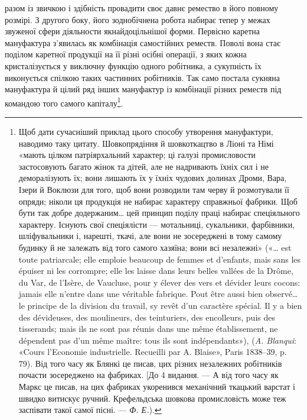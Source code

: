 \parcont{}  %
разом із звичкою і здібність провадити своє давнє ремество в
його повному розмірі. З другого боку, його зоднобічнена робота
набирає тепер у межах звуженої сфери діяльности якнайдоцільнішої
форми. Первісно каретна мануфактура з’явилась як комбінація
самостійних реместв. Поволі вона стає поділом каретної
продукції на її різні осібні операції, з яких кожна кристалізується
у виключну функцію одного робітника, а сукупність їх
виконується спілкою таких частинних робітників. Так само
постала сукняна мануфактура й цілий ряд інших мануфактур
із комбінації різних реместв під командою того самого капіталу\footnote{
Щоб дати сучасніший приклад цього способу утворення мануфактури,
наводимо таку цитату. Шовкопрядіння й шовкоткацтво в
Ліоні та Німі «мають цілком патріярхальний характер; ці галузі промисловости
застосовують багато жінок та дітей, але не надривають їхніх
сил і не деморалізують їх; вони лишають їх у їхніх чудових долинах Дроми,
Вара, Ізери й Воклюзи для того, щоб вони розводили там черву й розмотували
її опряди; ніколи ця продукція не набирає характеру справжньої
фабрики. Щоб бути так добре додержаним\dots{} цей принцип поділу праці
набирає спеціяльного характеру. Існують свої спеціялісти — мотальниці,
сукальники, фарбівники, шліфувальники і, нарешті, ткачі, але вони не
зосереджені в тому самому будинку й не залежать від того самого хазяїна;
вони всі незалежні» («\dots{} est toute patriarcale; elle emploie beaucoup de
femmes et d’enfants, mais sans les épuiser ni les corrompre; elle les laisse
dans leurs belles vallées de la Drôme, du Var, de l’Isère, de Vaucluse, pour
y élever des vers et dévider leurs cocons: jamais elle n’entre dans une véritable
fabrique. Pout être aussi bien observé\dots{} le principe de la division
du travail, sy revêt d’un caractère spécial. Il y a bien des dévideuses, des
moulineurs, des teinturiers, des encolleurs, puis des tisserands; mais ils
ne sont pas réunis dans une même établissement, ne dépendent pas d’un
même maître: tous ils sont indépendants»), (\emph{A. Blanqui}: «Cours l'Economie
industrielle. Recueilli par A. Blaise», Paris 1838--39, p. 79).
Від того часу як Блянкі це писав, цих різних незалежних робітників
почасти зосереджено на фабриках. [До 4 видання. — А від того часу
як Маркс це писав, на цих фабриках укоренився механічний ткацький
варстат і швидко витискує ручний. Крефельдська шовкова промисловість
може теж заспівати такої самої пісні. — \emph{Ф. Е.}).
}.

